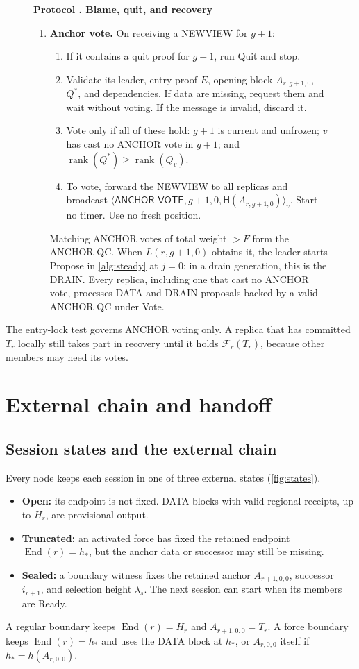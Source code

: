 \documentclass[11pt,a4paper]{article}
\newcommand{\RR}[1]{{\color{rrRed}#1}}
\newcommand{\FC}{\mathcal F}
\newcommand{\Hash}{\mathsf H}
\newcommand{\rank}{\operatorname{rank}}
\newcommand{\End}{\operatorname{End}}
\newcommand{\tagg}[1]{\ensuremath{\mathsf{#1}}}
\newcounter{protocol}
\newenvironment{protocol}[2]{\begin{figure}[htbp]\refstepcounter{protocol}\label{#1}
\begin{mdframed}[linewidth=.6pt,skipabove=0pt,skipbelow=0pt,
innertopmargin=7pt,innerbottommargin=7pt]\small
\textbf{Protocol \theprotocol. #2}\par\smallskip}{\end{mdframed}\end{figure}}
\begin{document}
\begin{protocol}{alg:recovery}{Blame, quit, and recovery}
\begin{enumerate}[label=\textbf{\arabic*)},itemsep=3pt]
\item \textbf{Anchor vote.} On receiving a NEWVIEW for $g+1$:
 \begin{enumerate}[label=(\alph*)]
 \item If it contains a quit proof for $g+1$, run Quit and stop.
 \item Validate its leader, entry proof $E$, opening block $A_{r,g+1,0}$,
       $Q^*$, and dependencies. If data are missing, request them and
       wait without voting. If the message is invalid, discard it.
 \item Vote only if all of these hold: $g+1$ is current and unfrozen; $v$
       has cast no ANCHOR vote in $g+1$; and $\rank(Q^*)\ge\rank(Q_v)$.
 \item To vote, forward the NEWVIEW to all replicas and broadcast
       $\langle\tagg{ANCHOR\mbox{-}VOTE},g+1,0,\Hash(A_{r,g+1,0})\rangle_v$.
       Start no timer. Use no fresh position.
 \end{enumerate}
 Matching ANCHOR votes \RR{of total weight $>F$} form the ANCHOR QC.
 When $L(r,g+1,0)$ obtains it, the leader starts Propose in
 \cref{alg:steady} at $j=0$\RR{; in a drain generation, this is the
 DRAIN}. Every replica, including one that cast no ANCHOR vote,
 processes DATA \RR{and DRAIN} proposals backed by a valid ANCHOR QC
 under Vote.
\end{enumerate}
\end{protocol}

The entry-lock test governs ANCHOR voting only. A replica that has
committed $T_r$ locally still takes part in recovery until it holds
$\FC_r(T_r)$, because other members may need its votes.

\section{External chain and handoff}
\label{sec:external}

\subsection{Session states and the external chain}
\label{sec:states}
Every node keeps each session in one of three external states
(\cref{fig:states}).
\begin{itemize}
\item \textbf{Open:} its endpoint is not fixed. DATA blocks with valid
regional receipts, up to $H_r$, are provisional output.
\item \textbf{Truncated:} an activated force has fixed the retained
endpoint $\End(r)=h_*$, but the anchor data or successor may still be
missing.
\item \textbf{Sealed:} a boundary witness fixes the retained anchor
$A_{r+1,0,0}$, successor $i_{r+1}$, and selection height $\lambda_s$.
The next session can start when its members are Ready.
\end{itemize}
A regular boundary keeps $\End(r)=H_r$ and
$A_{r+1,0,0}=T_r$. A force boundary keeps $\End(r)=h_*$ and uses the DATA
block at $h_*$, or $A_{r,0,0}$ itself if $h_*=h(A_{r,0,0})$.
\end{document}
